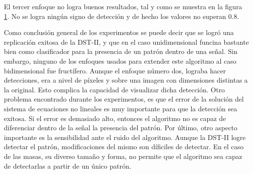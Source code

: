 \begin{figure}
	\caption{} \label{fig:example-mm-approach3}
\end{figure}

El tercer enfoque no logra buenos resultados, tal y como se muestra en la figura \ref{fig:example-mm-approach3}.
No se logra ningún signo de detección y de hecho los valores no superan $0.8$. 


Como conclusión general de los experimentos se puede decir que se logró una replicación exitosa de la DST-II,
y que en el caso unidimensional funcina bastante bien como clasificador para la presencia de un patrón 
dentro de una señal.  Sin embargo, ninguno de los enfoques usados para extender este algoritmo al caso
bidimensional fue fructífero. Aunque el enfoque número dos, lograba hacer detecciones, era a nivel de 
píxeles y sobre una imagen con dimensiones distintas a la original. Esto complica la capacidad de visualizar
dicha detección. Otro problema encontrado durante los experimentos, es que el error de la solución 
del sistema de ecuaciones no lineales es muy importante para que la detección sea exitosa. Si el error
es demasiado alto, entonces el algoritmo no es capaz de diferenciar dentro de la señal la presencia
del patrón. Por último, otro aspecto importante es la sensibilidad ante el ruido del algoritmo. 
Aunque la DST-II logre detectar el patrón, modificaciones del mismo son díficiles de detectar.
En el caso de las masas, su diverso tamaño y forma, no permite que el algoritmo sea capaz de detectarlas
a partir de un único patrón.

